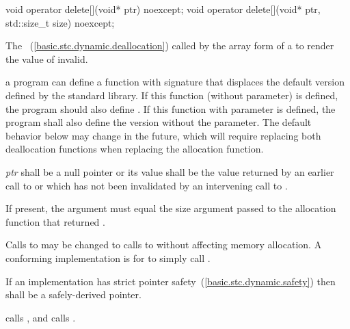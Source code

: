 %
\begin{itemdecl}
void operator delete[](void* ptr) noexcept;
void operator delete[](void* ptr, std::size_t size) noexcept;
\end{itemdecl}

\begin{itemdescr}
\pnum
\effects
The
~(\ref{basic.stc.dynamic.deallocation})
called by the array form of a
to render the value of  invalid.

\pnum
\replaceable
a \Cpp program can define a function with signature
 that displaces the default
version defined by the \Cpp standard library. If this function (without 
parameter) is defined, the program should also define
. If this function
with  parameter is defined, the program shall also define the version
without the  parameter.
\enternote The default behavior below may change in the future, which will require
replacing both deallocation functions when replacing the allocation function. \exitnote

\pnum
\requires
\textit{ptr} shall be a null pointer or its value shall be
the value returned by an earlier call to
or
which has not been invalidated by an intervening call to
.

\pnum
\requires If present, the  argument must equal the size
argument passed to the allocation function that returned .

\pnum
\required Calls to  may be changed
to calls to  without affecting memory allocation.
\enternote A conforming implementation is for
 to simply call
. \exitnote

\pnum
\requires
If an implementation has strict pointer safety~(\ref{basic.stc.dynamic.safety})
then  shall be a safely-derived pointer.

\pnum
{}
{} calls
, and
 calls
.
\end{itemdescr}

